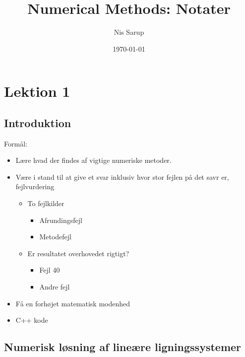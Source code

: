 \documentclass[a4wide,10pt]{article}
\begin{document}
\title{Numerical Methods: Notater}
\author{Nis Sarup}
\date{\today}
\maketitle

\pagebreak

\section{Lektion 1} %
\label{sec:lektion_1}

\subsection{Introduktion} %
\label{sub:introduktion}
Formål:
\begin{itemize}
	\item Lære hvad der findes af vigtige numeriske metoder.
	\item Være i stand til at give et svar inklusiv hvor stor fejlen på det savr er, fejlvurdering
	\begin{itemize}
		\item To fejlkilder
		\begin{itemize}
			\item Afrundingsfejl
			\item Metodefejl
		\end{itemize}
		\item Er resultatet overhovedet rigtigt?
		\begin{itemize}
			\item Fejl 40
			\item Andre fejl
		\end{itemize}
	\end{itemize}
	\item Få en forhøjet matematisk modenhed
	\item C++ kode
\end{itemize}

\subsection{Numerisk løsning af lineære ligningssystemer} %
\label{sub:numerisk_loesning_af_ligningssystemer}
\end{document}
